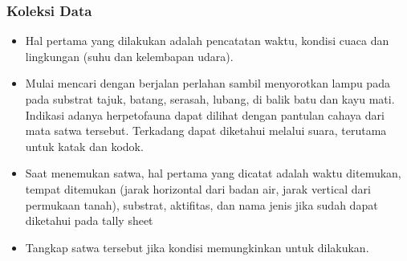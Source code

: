 \documentclass[
  oneside]{book}
\providecommand{\tightlist}{%
  \setlength{\itemsep}{0pt}\setlength{\parskip}{0pt}}
\begin{document}
\hypertarget{koleksi-data}{%
\subsubsection*{Koleksi Data}\label{koleksi-data}}

\begin{itemize}
\tightlist
\item
  Hal pertama yang dilakukan adalah pencatatan waktu, kondisi cuaca dan lingkungan (suhu dan kelembapan udara).
\item
  Mulai mencari dengan berjalan perlahan sambil menyorotkan lampu pada pada substrat tajuk, batang, serasah, lubang, di balik batu dan kayu mati. Indikasi adanya herpetofauna dapat dilihat dengan pantulan cahaya dari mata satwa tersebut. Terkadang dapat diketahui melalui suara, terutama untuk katak dan kodok.
\item
  Saat menemukan satwa, hal pertama yang dicatat adalah waktu ditemukan, tempat ditemukan (jarak horizontal dari badan air, jarak vertical dari permukaan tanah), substrat, aktifitas, dan nama jenis jika sudah dapat diketahui pada tally sheet
\item
  Tangkap satwa tersebut jika kondisi memungkinkan untuk dilakukan.


\end{itemize}
\end{document}
